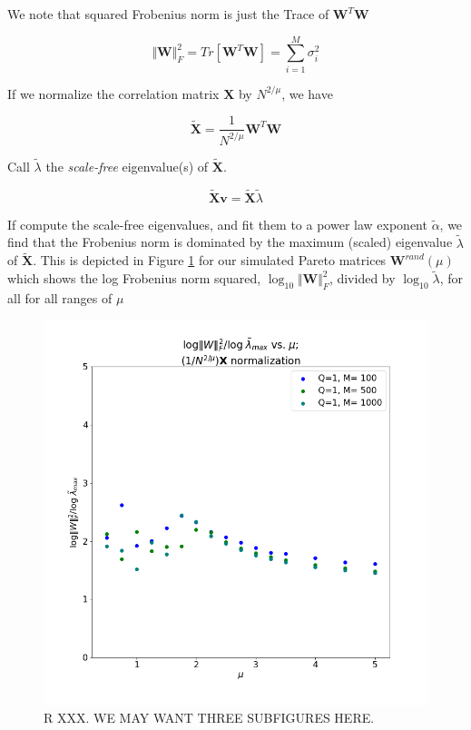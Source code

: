 We note that squared Frobenius norm is just the Trace of $\mathbf{W}^{T}\mathbf{W}$

$$\Vert\mathbf{W}\Vert_{F}^{2}=Tr[\mathbf{W}^{T}\mathbf{W}]=\sum_{i=1}^{M}\sigma^{2}_{i}$$

If we normalize the correlation matrix $\mathbf{X}$ by $N^{2/\mu}$, we have

$$\tilde{\mathbf{X}}=\dfrac{1}{N^{2/\mu}}\mathbf{W}^{T}\mathbf{W}$$

Call $\tilde{\lambda}$ the \emph{scale-free} eigenvalue(s) of $\tilde{\mathbf{X}}$.

$$\tilde{\mathbf{X}}\mathbf{v}=\tilde{\mathbf{X}}\tilde{\lambda}$$

If compute the scale-free eigenvalues, and fit them to a power law exponent $\tilde{\alpha}$, we find that the Frobenius norm is dominated by the maximum (scaled) eigenvalue $\tilde{\lambda}$ of $\tilde{\mathbf{X}}$.  
This is depicted in Figure 
  \ref{fig:logNormHat}
for our simulated Pareto matrices  $\mathbf{W}^{rand}(\mu)$ which shows
the log Frobenius norm squared, $\log_{10}\Vert\mathbf{W}\Vert^{2}_{F}$, divided by $\log_{10}\tilde{\lambda}$,
for all for all ranges of $\mu$

\begin{figure}[!htb]
 \centering
   \includegraphics[scale=0.40]{img/LogNorm-Lmax-Scaled.png}
   \caption{R XXX.  WE MAY WANT THREE SUBFIGURES HERE.
   }
  \label{fig:logNormHat}
\end{figure}

